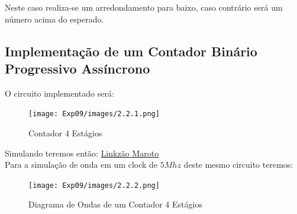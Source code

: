 \documentclass[12pt]{article}
\begin{document}
Neste caso realiza-se um arredondamento para baixo, caso contrário será um número acima do esperado.

\subsection{Implementação de um Contador Binário Progressivo Assíncrono}\label{sec:2.2}

O circuito implementado será:
\begin{figure}[H]
  \centering
  \texttt{[image: Exp09/images/2.2.1.png]}
  \caption{Contador 4 Estágios}\label{fig:2.2.1.png}
\end{figure}

Simulando teremos então:
\href{google.com}{Linkzão Maroto}
\\
Para a simulação de onda em um clock de $5Mhz$ deste mesmo circuito teremos:
\begin{figure}[H]
  \centering
  \texttt{[image: Exp09/images/2.2.2.png]}
  \caption{Diagrama de Ondas de um Contador 4 Estágios}\label{fig:2.2.2.png}
\end{figure}
\end{document}
